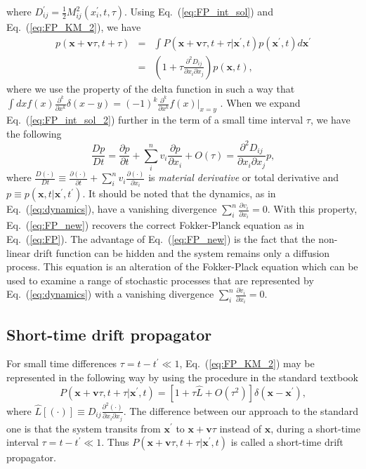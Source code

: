 \documentclass[aps,pre,reprint,superscriptaddress,showpacs,amsmath
,floatfix
]{revtex4-2}
\renewcommand{\vec}[1]{\boldsymbol{#1}}
\newcommand{\eq}[1]{Eq.~(\ref{#1})}
\newcommand{\Order}[1]{O(#1)}
\newcommand{\Opt}[1]{\hat{#1}}
\begin{document}
where $D_{ij}^\prime = \frac{1}{2} M_{ij}^2(x_i^\prime,t,\tau)$. Using \eq{eq:FP_int_sol} and \eq{eq:FP_KM_2}, we have
\begin{eqnarray}
\label{eq:FP_int_sol_2}
p(\vec{x}+\vec{v}\tau,t+\tau) &=& \int P(\vec{x}+\vec{v}\tau,t+\tau|\vec{x}^\prime,t)  p(\vec{x}^\prime,t) d\vec{x}^\prime \nonumber\\
&=& \left( 1 + \tau \frac{\partial^2 D_{ij} }{\partial x_i\partial x_j} \right) p(\vec{x},t),
\end{eqnarray}
where we use the property of the delta function in such a way that $\int dx f(x) \frac{\partial^k }{\partial x^k} \delta(x-y) = (-1)^k \frac{\partial^k }{\partial x^k}f(x) \vert_{x=y} $ \cite{apaza2020homotopy}. When we expand \eq{eq:FP_int_sol_2} further in the term of a small time interval $\tau$, we have the following
\begin{equation}
\label{eq:FP_new}
\frac{D p}{D t} = \frac{\partial p}{\partial t} + \sum_{i}^{n} v_i\frac{\partial p}{\partial x_i} + \Order{\tau} =  \frac{\partial^2 D_{ij} }{\partial x_i\partial x_j} p ,
\end{equation}
where $\frac{D (\cdot)}{D t} \equiv \frac{\partial (\cdot)}{\partial t} + \sum_{i}^{n} v_i\frac{\partial (\cdot)}{\partial x_i}$ is \emph{material derivative} or total derivative and $p \equiv p(\vec{x},t|\vec{x}^\prime,t^\prime)$.  It should be noted that the dynamics, as in \eq{eq:dynamics}, have a vanishing divergence $\sum_{i}^{n} \frac{\partial v_i }{\partial x_i} = 0$. With this property, \eq{eq:FP_new} recovers the correct Fokker-Planck equation as in \eq{eq:FP}. The advantage of \eq{eq:FP_new} is the fact that the non-linear drift function can be hidden and the system remains only a diffusion process. This equation is an alteration of the Fokker-Plack equation which can be used to examine a range of stochastic processes that are represented by \eq{eq:dynamics} with a vanishing divergence $\sum_{i}^{n} \frac{\partial v_i }{\partial x_i} = 0$.

\subsection{Short-time drift propagator}
For small time differences $\tau=t-t^\prime \ll 1$, \eq{eq:FP_KM_2} may be represented in the following way by using the procedure in the standard textbook \cite{risken1996fokker}
\begin{equation}
\label{eq:P_short}
P(\vec{x}+\vec{v}\tau,t+\tau|\vec{x}^\prime,t) = \left[ 1 + \tau\Opt{L}  + \Order{\tau^2} \right]\delta(\vec{x}-\vec{x}^\prime) ,
\end{equation}
where $\Opt{L}[(\cdot)] \equiv  D_{ij} \frac{\partial^2 (\cdot) }{\partial x_i\partial x_j}$. The difference between our approach to the standard one is that the system transits from $\vec{x}^\prime$ to $\vec{x}+\vec{v}\tau$ instead of $\vec{x}$, during a short-time interval $\tau=t-t^\prime \ll 1$. Thus $P(\vec{x}+\vec{v}\tau,t+\tau|\vec{x}^\prime,t)$ is called a short-time drift propagator. 
\end{document}

